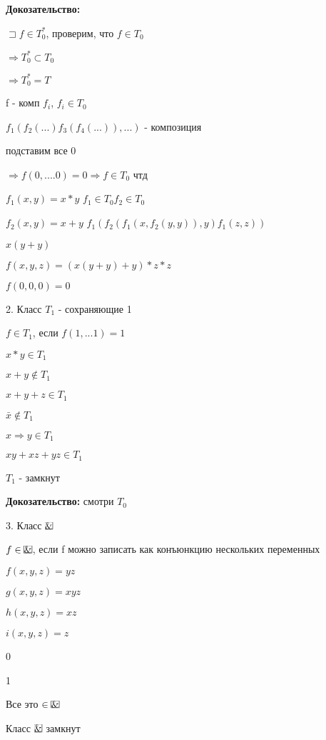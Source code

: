 \documentclass[russian]{lecture-notes}
\begin{document}
	\textbf{Докозательство:}

	$\sqsupset f \in T_{0}^{*}$, проверим, что $f \in T_{0}$

	$\Rightarrow T_{0}^{*} \subset T_{0}$

	$\Rightarrow T_{0}^{*} = T$

	f - комп $f_{i}$, $f_{i} \in T_{0}$

	$f_{1}(f_{2}(...)f_{3}(f_{4}(...)),...)$ - композиция

	подставим все 0

	$\Rightarrow f(0,....0) = 0 \Rightarrow f \in T_{0} $ чтд

	\begin{example}
		$f_{1}(x,y) = x*y$ \qquad $f_{1} \in T_{0} f_{2} \in T_{0}$

		$f_{2}(x,y) = x+y$ \qquad $f_{1}(f_{2}(f_{1}(x,f_{2}(y,y)),y)f_{1}(z,z))$

		$x(y+y)$

		$f(x,y,z) = (x(y+y)+y)*z*z$

		$f(0,0,0) = 0$

		2. Класс $T_{1}$ - сохраняющие 1

		$f \in T_{1}$, если $f(1,...1) = 1$

		$x*y \in T_{1}$

		$x+y \notin T_{1}$

		$x+y+z \in T_{1}$

		$\bar{x} \notin T_{1}$

		$x \Rightarrow y \in T_{1}$

		$xy + xz + yz \in T_{1}$

		\begin{proposition}
			$T_{1}$ - замкнут
			\end {proposition}


		\textbf{Докозательство:} смотри $T_{0}$

		3. Класс $\frame{\&}$

		$f \in \frame{\&}$, если f можно записать как конъюнкцию нескольких переменных

		$f(x,y,z) = yz$

		$g(x,y,z) = xyz$

		$h(x,y,z) = xz$

		$i(x,y,z) = z$

		0

		1

		Все это $\in \frame{\&}$

		\begin{proposition}
			Класс $\frame{\&}$ замкнут
			\end{proposition}


\end{example}
\end{document}
